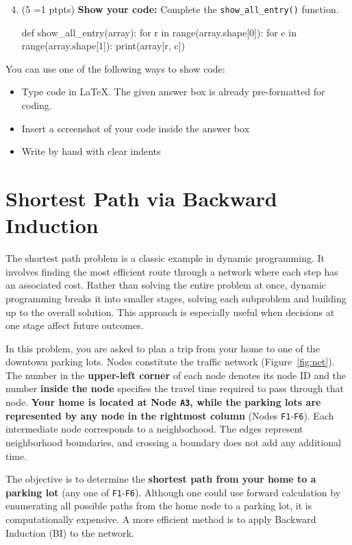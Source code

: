 \documentclass[11pt, letter, answers]{exam}
\newcommand{\pt}[1]{
    \small{(#1 \ifnum#1=1 pt\else pts\fi)}
    \normalsize
}
\newcommand{\sCode}{\textbf{Show your code: }}
\begin{document}
\begin{enumerate}
\setcounter{enumi}{3}
\item \pt{5} \sCode Complete the \texttt{show\_all\_entry()} function.

\begin{codeBox}[height=2in]
def show_all_entry(array):
    for r in range(array.shape[0]):
        for c in range(array.shape[1]):
            print(array[r, c])
\end{codeBox}
\end{enumerate}


You can use one of the following ways to show code:
\begin{itemize}
    \item Type code in \LaTeX. The given answer box is already pre-formatted for coding.
    \item Insert a screenshot of your code inside the answer box
    \item Write by hand with clear indents
\end{itemize}




\newpage
\section{Shortest Path via Backward Induction}
\label{sec:q1}

The shortest path problem is a classic example in dynamic programming. It involves finding the most efficient route through a network where each step has an associated cost. Rather than solving the entire problem at once, dynamic programming breaks it into smaller stages, solving each subproblem and building up to the overall solution. This approach is especially useful when decisions at one stage affect future outcomes.

In this problem, you are asked to plan a trip from your home to one of the downtown parking lots. Nodes constitute the traffic network (Figure~\ref{fig:net}). The number in the \textbf{upper-left corner} of each node denotes its node ID and the number \textbf{inside the node} specifies the travel time required to pass through that node. \textbf{Your home is located at Node \texttt{A3}, while the parking lots are represented by any node in the rightmost column} (Nodes \texttt{F1}-\texttt{F6}). Each intermediate node corresponds to a neighborhood. The edges represent neighborhood boundaries, and crossing a boundary does not add any additional time. 

The objective is to determine the \textbf{shortest path from your home to a parking lot} (any one of \texttt{F1}-\texttt{F6}). Although one could use forward calculation by enumerating all possible paths from the home node to a parking lot, it is computationally expensive. A more efficient method is to apply Backward Induction (BI) to the network. 
\end{document}

